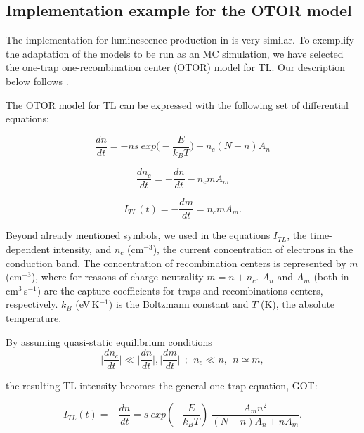 \hypertarget{implementation-example-for-the-otor-model}{%
\subsection{Implementation example for the OTOR
model}\label{implementation-example-for-the-otor-model}}

The implementation for luminescence production in  is
very similar. To exemplify the adaptation of the models to be run as an
MC simulation, we have selected the one-trap one-recombination center
(OTOR) model \citep[based on][]{Halperin:1960gr} for TL. Our description
below follows \citet{Pagonis:2014cs}.

The OTOR model for TL can be expressed with the following set of
differential equations:

\begin{equation}
\frac{dn}{dt} = -ns~exp\big(-\frac{E}{k_{B}T}\big) + n_c(N-n)A_{n}
\end{equation}

\begin{equation}
\frac{dn_{c}}{dt} = -\frac{dn}{dt} - n_{c}mA_{m}
\end{equation}

\begin{equation}
I_{TL}(t) = -\frac{dm}{dt}= n_{c}mA_{m}.
\end{equation}

Beyond already mentioned symbols, we used in the equations \(I_{TL}\),
the time-dependent intensity, and \(n_c\) (cm\(^{-3}\)), the current
concentration of electrons in the conduction band. The concentration of
recombination centers is represented by \(m\) (cm\(^{-3}\)), where for
reasons of charge neutrality \(m = n + n_{c}\). \(A_{n}\) and \(A_{m}\)
(both in cm\(^{3}\,\)s\(^{-1}\)) are the capture coefficients for traps
and recombinations centers, respectively. \(k_{B}\) (eV\(\,\)K\(^{-1}\))
is the Boltzmann constant and \(T\) (K), the absolute temperature.

By assuming quasi-static equilibrium conditions \citep{Chen_2011ij}
\begin{equation}
\Big|\frac{dn_{c}}{dt}\Big| \ll \Big|\frac{dn}{dt}\Big|,\Big|\frac{dm}{dt}\Big|~~;~~ n_{c} \ll n, ~~ 
n \simeq m, 
\end{equation}

the resulting TL intensity becomes the general one trap equation, GOT:

\begin{equation}
I_{TL}(t) = -\frac{dn}{dt} = s~exp(-\frac{E}{k_{B}T})~\frac{A_{m}n^{2}}{(N-n)A_{n} + nA_{m}}.
\end{equation}

